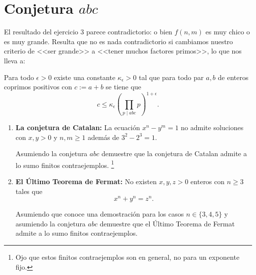 \documentclass[11pt, reqno]{amsart}
\begin{document}
\section{Conjetura $abc$}
El resultado del ejercicio 3 parece contradictorio: o bien $f(n, m)$ es muy chico o es muy grande.
Resulta que no es nada contradictorio si cambiamos nuestro criterio de <<ser grande>> a <<tener muchos factores primos>>, lo que nos lleva a:
\begin{con}
	Para todo $\epsilon > 0$ existe una constante $\kappa_\epsilon > 0$ tal que para todo par $a, b$ de enteros coprimos positivos
	con $c := a + b$ se tiene que
	$$ c \le \kappa_\epsilon \left( \prod_{p \mid abc} p \right)^{1 + \epsilon}. $$
\end{con}

\begin{enumerate}[resume]
	\item \textbf{La conjetura de Catalan:} La ecuación $x^n - y^m = 1$ no admite soluciones con $x, y > 0$ y $n, m \ge 1$ además de $3^2 - 2^3 = 1$.

		Asumiendo la conjetura $abc$ demuestre que la conjetura de Catalan admite a lo sumo finitos contraejemplos.%
		\footnote{Ojo que estos finitos contraejemplos son en general, no para un exponente fijo.}

	\item \textbf{El Último Teorema de Fermat:} No existen $x, y, z > 0$ enteros con $n \ge 3$ tales que
		\[
			x^n + y^n = z^n.
		\]

		Asumiendo que conoce una demostración para los casos $n \in \{ 3, 4, 5 \}$ y asumiendo la conjetura $abc$
		demuestre que el Último Teorema de Fermat admite a lo sumo finitos contraejemplos.
\end{enumerate}
\end{document}
